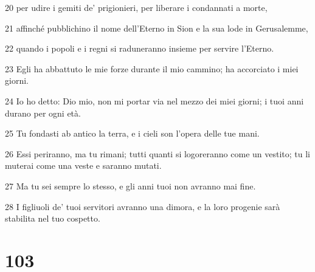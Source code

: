 \par 20 per udire i gemiti de' prigionieri, per liberare i condannati a morte,
\par 21 affinché pubblichino il nome dell'Eterno in Sion e la sua lode in Gerusalemme,
\par 22 quando i popoli e i regni si raduneranno insieme per servire l'Eterno.
\par 23 Egli ha abbattuto le mie forze durante il mio cammino; ha accorciato i miei giorni.
\par 24 Io ho detto: Dio mio, non mi portar via nel mezzo dei miei giorni; i tuoi anni durano per ogni età.
\par 25 Tu fondasti ab antico la terra, e i cieli son l'opera delle tue mani.
\par 26 Essi periranno, ma tu rimani; tutti quanti si logoreranno come un vestito; tu li muterai come una veste e saranno mutati.
\par 27 Ma tu sei sempre lo stesso, e gli anni tuoi non avranno mai fine.
\par 28 I figliuoli de' tuoi servitori avranno una dimora, e la loro progenie sarà stabilita nel tuo cospetto.

\chapter{103}

